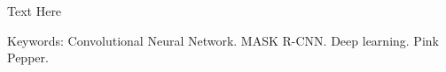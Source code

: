 \begin{resumo}[ABSTRACT]
\vspace*{-6mm}
    \begin{otherlanguage}{english}
    
        Text Here
    
    Keywords: Convolutional Neural Network. MASK R-CNN. Deep learning. Pink Pepper.
    
    \end{otherlanguage}
\end{resumo}
